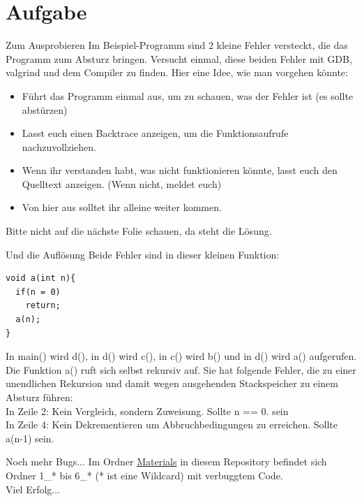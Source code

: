 \section{Aufgabe}
\begin{frame}{Zum Ausprobieren}
Im Beispiel-Programm sind 2 kleine Fehler versteckt, die das Programm zum Absturz bringen. Versucht einmal, diese beiden Fehler mit GDB, valgrind und dem Compiler zu finden. Hier eine Idee, wie man vorgehen könnte:
\begin{itemize}
 \item F\"uhrt das Programm einmal aus, um zu schauen, was der Fehler ist (es sollte abstürzen)
 \item Lasst euch einen Backtrace anzeigen, um die Funktionsaufrufe nachzuvollziehen.
 \item Wenn ihr verstanden habt, was nicht funktionieren könnte, lasst euch den Quelltext anzeigen. (Wenn nicht, meldet euch)
 \item Von hier aus solltet ihr alleine weiter kommen.
\end{itemize}
 Bitte nicht auf die n\"achste Folie schauen, da steht die Lösung. 
\end{frame}
\begin{frame}[fragile]{Und die Aufl\"osung}
Beide Fehler sind in dieser kleinen Funktion:
\begin{lstlisting}
void a(int n){
  if(n = 0)
    return;
  a(n);
}\end{lstlisting}
In main() wird d(), in d() wird c(), in c() wird b() und in d() wird a() aufgerufen. Die Funktion a() ruft sich selbst rekursiv auf. Sie hat folgende Fehler, die zu einer unendlichen Rekursion und damit wegen ausgehenden Stackspeicher zu einem Absturz f\"uhren:\\
In Zeile 2: Kein Vergleich, sondern Zuweisung. Sollte n == 0. sein\\
In Zeile 4: Kein Dekrementieren um Abbruchbedingungen zu erreichen. Sollte a(n-1) sein.
\end{frame}
\begin{frame}[fragile]{Noch mehr Bugs...}
Im Ordner \href{https://github.com/scholzp/c-lessons/tree/master/materials}{Materials} in diesem Repository befindet sich Ordner 1\_* bis 6\_* (* ist eine Wildcard) mit verbuggtem Code. \\
\bigskip
Viel Erfolg...
\end{frame}


